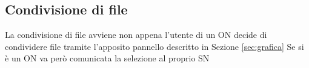 
\subsection{Condivisione di file}%
La condivisione di file avviene non appena l'utente di un ON decide di condividere file tramite l'apposito pannello descritto in Sezione \ref{sec:grafica}
Se si è un ON va però comunicata la selezione al proprio SN